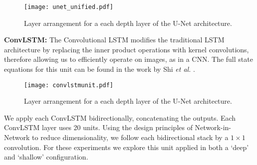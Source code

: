 \documentclass[journal,transmag]{IEEEtran}
\begin{document}

\begin{figure}
\centering
\texttt{[image: unet\_unified.pdf]}
\caption{Layer arrangement for a each depth layer of the U-Net architecture.}
\label{fig:unetfull}
\end{figure}

\textbf{ConvLSTM:} The Convolutional LSTM modifies the traditional LSTM architecture \cite{Hochreiter1997} by replacing the inner product operations with kernel convolutions, therefore allowing us to efficiently operate on images, as in a CNN. The full state equations for this unit can be found in the work by Shi \emph{et al.} \cite{SHI2015}.


\begin{figure}[t]
\centering
\texttt{[image: convlstmunit.pdf]}
\caption{Layer arrangement for a each depth layer of the U-Net architecture. }
\label{fig:convlstmunit}
\end{figure}

We apply each ConvLSTM bidirectionally, concatenating the outputs. Each ConvLSTM layer uses 20 units. Using the design principles of Network-in-Network \cite{Lin2013} to reduce dimensionality, we follow each bidirectional stack by a $1\times1$ convolution. For these experiments we explore this unit applied in both a `deep' and `shallow' configuration.
\end{document}
